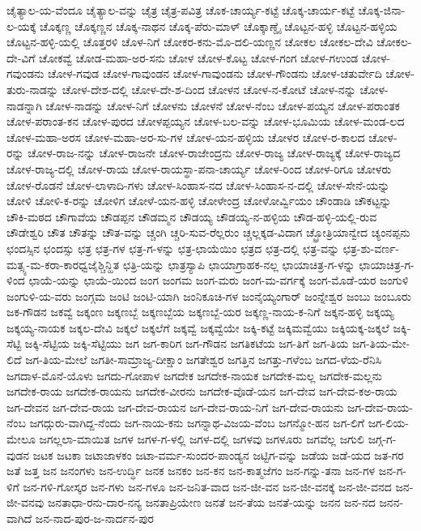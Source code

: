 ಚೈತ್ಯಾಲ-ಯ-ವೆಂದೂ
ಚೈತ್ಯಾಲ-ವನ್ನು
ಚೈತ್ರ
ಚೈತ್ರ-ಪವಿತ್ರ
ಚೊಕ-ಚಾರ್ಯ್ಯ-ಕಟ್ಟೆ
ಚೊಕ್ಕ-ಚಾರ್ಯ-ಕಟ್ಟೆ
ಚೊಕ್ಕ-ಜಿನಾ-ಲ-ಯಕ್ಕೆ
ಚೊಕ್ಕಣ್ಣ
ಚೊಕ್ಕಣ್ಣನ
ಚೊಕ್ಕ-ನಾಥನ
ಚೊಕ್ಕ-ಪೆರು-ಮಾಳ್
ಚೊಕ್ಕಾಣ್ಡೈ
ಚೊಟ್ಟನ-ಹಳ್ಳಿ
ಚೊಟ್ಟನ-ಹಳ್ಳಿಯ
ಚೊಟ್ಟನ-ಹಳ್ಳಿ-ಯಲ್ಲಿ
ಚೊತ್ತರಳಿ
ಚೊಳ-ನಿಗೆ
ಚೋಕರ-ಕನು-ಮೊ-ದಲಿ-ಯಣ್ಣನ
ಚೋಕಲ
ಚೋಕಲ-ದೇವಿ
ಚೋಕಲ-ದೇ-ವಿಗೆ
ಚೋಕವ್ವೆ
ಚೋಡ-ಮಹಾ-ಅರ-ಸನು
ಚೋಳ
ಚೋಳ-ಕೊಟ್ಟ
ಚೋಳ-ಗಂಗ
ಚೋಳ-ಗಉಂಡ
ಚೋಳ-ಗವುಂಡನು
ಚೋಳ-ಗವುಡ
ಚೋಳ-ಗಾವುಂಡನ
ಚೋಳ-ಗಾವುಂಡನು
ಚೋಳ-ಗೌಂಡನು
ಚೋಳ-ಚತುರ್ವೇದಿ
ಚೋಳ-ತುರು-ನಾಡನ್ನು
ಚೋಳ-ದೇಶ-ದಲ್ಲಿ
ಚೋಳ-ದೇ-ಶ-ದಿಂದ
ಚೋಳನ
ಚೋಳ-ನ-ಕೋಟೆ
ಚೋಳ-ನನ್ನು
ಚೋಳ-ನಾಡನ್ನಾಗಿ
ಚೋಳ-ನಾಡನ್ನು
ಚೋಳ-ನಿಗೆ
ಚೋಳನು
ಚೋಳನೆ
ಚೋಳ-ನೆಂಬ
ಚೋಳ-ಪಯ್ಯನ
ಚೋಳ-ಪರಾಂತಕ
ಚೋಳ-ಪರಾಂತ-ಕನ
ಚೋಳ-ಪುರದ
ಚೋಳಪ್ಪಯ್ಯನ
ಚೋಳ-ಬಲ-ವನ್ನು
ಚೋಳ-ಭೂಮಿಯ
ಚೋಳ-ಮಂಡ-ಲದ
ಚೋಳ-ಮಹಾ-ಅರಸ
ಚೋಳ-ಮಹಾ-ಅರ-ಸು-ಗಳ
ಚೋಳ-ಯನ-ಹಳ್ಳಿಯ
ಚೋಳರ
ಚೋಳ-ರ-ಕಾಲದ
ಚೋಳ-ರನ್ನು
ಚೋಳ-ರಾಜ-ನನ್ನು
ಚೋಳ-ರಾಜನೇ
ಚೋಳ-ರಾಜೇಂದ್ರನು
ಚೋಳ-ರಾಜ್ಯ
ಚೋಳ-ರಾಜ್ಯಕ್ಕೆ
ಚೋಳ-ರಾಜ್ಯದ
ಚೋಳ-ರಾಜ್ಯ-ದಲ್ಲಿ
ಚೋಳ-ರಾಯ
ಚೋಳ-ರಾಯಸ್ಥಾ-ಪನಾ-ಚಾರ್ಯ್ಯ
ಚೋಳ-ರಿಂದ
ಚೋಳ-ರಿಗೂ
ಚೋಳರು
ಚೋಳ-ರೊಡನೆ
ಚೋಳ-ಲಾಳಾದಿ-ಗಳು
ಚೋಳ-ಸಿಂಹಾಸ-ನದ
ಚೋಳ-ಸಿಂಹಾಸ-ನ-ದಲ್ಲಿ
ಚೋಳ-ಸೇನೆ-ಯನ್ನು
ಚೋಳಿ
ಚೋಳಿ-ಕ-ರನ್ನು
ಚೋಳಿಗ
ಚೋಳೆ-ಯನ-ಹಳ್ಳಿ
ಚೋಳೇಂದ್ರ
ಚೋಳೋರ್ವ್ವಿಯಂ
ಚೌಂಡಾಡಿ
ಚೌಕಟ್ಟನ್ನು
ಚೌಕಿ-ಮಠದ
ಚೌಗಾವೆಯ
ಚೌಡಪ್ಪನ
ಚೌಡಮ್ಮನ
ಚೌಡಯ್ಯ
ಚೌಡಯ್ಯ-ನ-ಹಳ್ಳಿಯ
ಚೌಡ-ಹಳ್ಳಿ-ಯಲ್ಲಿ-ರುವ
ಚೌಡೇಶ್ವರಿ
ಚೌತ
ಚೌತನ್ನು
ಚೌತ-ವನ್ನು
ಚ್ಚಂಗಿ
ಚ್ಚರಿ-ಸುವ-ರೆಲ್ಲರುಂ
ಚ್ಚಲ್ಲಕ್ಕಡ-ವಿದಾಗ
ಚ್ಛ್ರೋತ್ರಿಯಾನ್ವೇದ
ಚ್ಯಂನಪ್ಪನು
ಛಂದಸ್ಸಿನ
ಛಂದಸ್ಸು
ಛತ್ರ
ಛತ್ರ-ಗಳ
ಛತ್ರ-ಗ-ಳನ್ನು
ಛತ್ರ-ಛಾಯೆಯಿಂ
ಛತ್ರದ
ಛತ್ರ-ದಲ್ಲಿ
ಛತ್ರ-ವನ್ನು
ಛತ್ರ-ಶು-ವರ್ಣ-ಮತ್ಸ್ಯ-ಮ-ಕರಾ-ಕಾರಧ್ವಜೈಶ್ಚಿನ್ಹಿತ
ಛತ್ರಿ-ಯನ್ನು
ಛಾತ್ರಸ್ಯಾಪಿ
ಛಾಯಾಗ್ರಾಹಕ-ನಲ್ಲ
ಛಾಯಾಚಿತ್ರ-ಗ-ಳನ್ನು
ಛಾಯಾಚಿತ್ರ-ಗ-ಳಿಂದ
ಛಾಯೆ-ಯನ್ನು
ಛಾಯೆ-ಯಿಂದ
ಜಂಗ
ಜಂಗಮ
ಜಂಗ-ಮರು
ಜಂಗ-ಮ-ವರ್ಗಕ್ಕೆ
ಜಂಗ-ಮೊಡೆ-ಯರ
ಜಂಗುಳಿ
ಜಂಗುಳಿ-ಯ-ವರು
ಜಂಗ್ಗಮ
ಜಂಟಿ
ಜಂಟಿ-ಯಾಗಿ
ಜಂನಿಕೂಚಿ-ಗಳ
ಜಂನೈಯ್ಯಂಗಾರ್
ಜಂನ್ನೇಶ್ವರ
ಜಂಬು
ಜಂಬೂರು
ಜಕ-ಗೌಡನ
ಜಕವ್ವೆ
ಜಕ್ಕಂಣ
ಜಕ್ಕಣಬ್ಬೆ
ಜಕ್ಕಣಬ್ಬೆಯ
ಜಕ್ಕಣಬ್ಬೆ-ಯರ
ಜಕ್ಕಣ್ಣ-ನಾಯ-ಕ-ನಿಗೆ
ಜಕ್ಕನ-ಹಳ್ಳಿ
ಜಕ್ಕಯ್ಯ
ಜಕ್ಕಯ್ಯ-ನಾಯಕ
ಜಕ್ಕಲ-ದೇವಿ
ಜಕ್ಕಲೆ
ಜಕ್ಕಲೆಗೆ
ಜಕ್ಕವ್ವೆ
ಜಕ್ಕವ್ವೆಯೇ
ಜಕ್ಕಿ-ಕಟ್ಟೆ
ಜಕ್ಕಿಮವ್ವೆಯು
ಜಕ್ಕಿಯಕ್ಕ-ಜಕ್ಕಲೆ
ಜಕ್ಕಿ-ಸೆಟ್ಟಿ
ಜಕ್ಕಿ-ಸೆಟ್ಟಿಯ
ಜಕ್ಕಿ-ಸೆಟ್ಟಿಯು
ಜಗ
ಜಗ-ಕಾರಿಗ
ಜಗ-ಗೌಡನ
ಜಗತಿಕಟೆಯ
ಜಗ-ತಿಗೆ
ಜಗ-ತಿಯ
ಜಗ-ತಿಯ-ಮೇ-ಲಿದೆ
ಜಗ-ತಿಯ-ಮೇಲೆ
ಜಗತೀ-ಸಾಮ್ರಾಜ್ಯ-ದೀಕ್ಷಾಂ
ಜಗತೇಶ್ವರ
ಜಗತ್ತಿನ
ಜಗತ್ತು-ಗಳೆಂಬ
ಜಗದ-ಳೆಯ-ರೆನಿಸಿ
ಜಗದಾಳ-ಮೊನೆ-ಯೊಳು
ಜಗದು-ಗೋಪಾಳ
ಜಗದೇಕ
ಜಗದೇಕ-ನಾಯಕ
ಜಗದೇಕ-ಮಲ್ಲ
ಜಗದೇಕ-ಮಲ್ಲನು
ಜಗದೇಕ-ರಾಯ
ಜಗದೇಕ-ರಾಯನು
ಜಗದೇಕ-ವೀರನು
ಜಗದೇಕ-ವೊಡೆ-ಯನ
ಜಗ-ದೇವ
ಜಗ-ದೇವ-ಕಅ-ರಾಯ
ಜಗ-ದೇವನ
ಜಗ-ದೇವ-ರಾಯ
ಜಗ-ದೇವ-ರಾಯನ
ಜಗ-ದೇವ-ರಾಯ-ನಿಗೆ
ಜಗ-ದೇವ-ರಾಯನು
ಜಗ-ದೇವ-ರಾಯ-ನೆಂಬ
ಜಗದ್ಗುರು-ವಾಗಿದ್ದ-ನೆಂದು
ಜಗ-ನಾಯ-ಕನು
ಜಗನ್ನಾಥ-ವಿಜಯ-ವೆಂಬ
ಜಗನ್ಮೋ-ಹನ
ಜಗ-ಲಿಗೆ
ಜಗ-ಲಿಯ-ಮೇಲೂ
ಜಗಲ್ಲಲಾ-ಮಾಯಿತ
ಜಗಳ
ಜಗಳ-ಗ-ಳಲ್ಲಿ
ಜಗಳ-ದಲ್ಲಿ
ಜಗಳವು
ಜಗಳೂರು
ಜಗವೆಲ್ಲ
ಜಗುಲಿ
ಜಗ್ಗ-ಗ-ವುಡನ
ಜಟಕ
ಜಟಕಾ
ಜಟಾಜಾಳಕಂ
ಜಟಾ-ವರ್ಮ-ಸುಂದರ-ಪಾಂಡ್ಯನ
ಜಟ್ಟಿಗ-ವನ್ನು
ಜಡೆಯ
ಜಡೆ-ಯದ
ಜತ-ಗರ
ಜತೆ
ಜತ್ತ
ಜನ
ಜನಂಗಳು
ಜನ-ಉರ್ದ್ಧಿ
ಜನಕ
ಜನಕಂ
ಜನ-ಕನ
ಜನ-ಕಾತ್ಮಜೆಗಂ
ಜನ-ಗನ್ನು-ತನಾ
ಜನ-ಗಳ
ಜನ-ಗ-ಳಿಗೆ
ಜನ-ಗಳಿ-ಗೋಸ್ಕರ
ಜನ-ಗಳು
ಜನ-ಗಳೂ
ಜನ-ಜನಿತ-ವಾದ
ಜನ-ಜೀ-ವನ
ಜನ-ಜೀ-ವನಕ್ಕೆ
ಜನ-ಜೀ-ವನದ
ಜನ-ಜೀ-ವನವು
ಜನತಾಧಾ-ರನು-ದಾರ-ನನ್ಯ
ಜನತಾಪ್ರಿಯೇಣ
ಜನತೆ
ಜನ-ತೆಯ
ಜನತೆ-ಯನ್ನು
ಜನನ
ಜನ-ನದ
ಜನನ-ವಾಗಿದೆ
ಜನ-ನಾದ-ಪುರ-ಜ-ನಾರ್ದನ-ಪುರ
